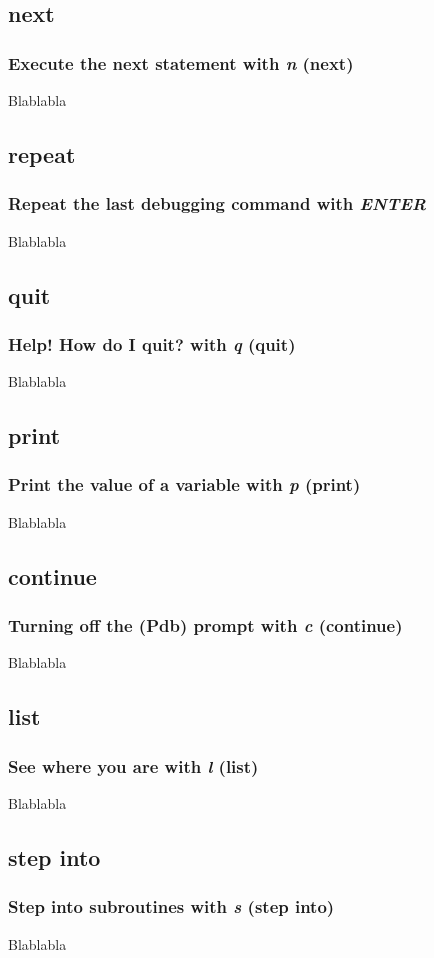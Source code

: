 \subsection{next}
\begin{frame}
\frametitle{Execute the next statement with \textit{\textbf{n}} (next)}
Blablabla
\end{frame}

\subsection{repeat}
\begin{frame}
\frametitle{Repeat the last debugging command with \textit{\textbf{ENTER}}}
Blablabla
\end{frame}

\subsection{quit}
\begin{frame}
\frametitle{Help! How do I quit? with \textit{\textbf{q}} (quit)}
Blablabla
\end{frame}

\subsection{print}
\begin{frame}
\frametitle{Print the value of a variable with \textit{\textbf{p}} (print)}
Blablabla
\end{frame}

\subsection{continue}
\begin{frame}
\frametitle{Turning off the (Pdb) prompt with \textit{\textbf{c}} (continue)}
Blablabla
\end{frame}

\subsection{list}
\begin{frame}
\frametitle{See where you are with \textit{\textbf{l}} (list)}
Blablabla
\end{frame}

\subsection{step into}
\begin{frame}
\frametitle{Step into subroutines with \textit{\textbf{s}} (step into)}
Blablabla
\end{frame}

